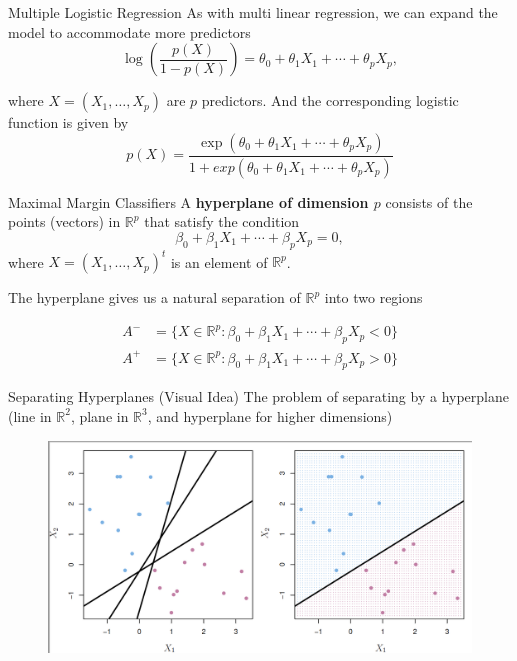 \documentclass{beamer}
\begin{document}
\begin{frame}{Multiple Logistic Regression}
	As with multi linear regression, we can expand the model to accommodate more predictors
	\begin{equation*}
		\log \left( \frac{p(X)}{1-p(X)} \right) = \theta_0 + \theta_1 X_1 + \cdots+ \theta_p X_p,
	\end{equation*} 
	
	where $X=(X_1,\ldots,X_p)$ are $p$ predictors. And the corresponding logistic function is given by
	\begin{equation*}
		p(X)= \frac{\exp(\theta_0 + \theta_1 X_1 + \cdots+ \theta_p X_p)}{1 +exp(\theta_0 + \theta_1 X_1 + \cdots+ \theta_p X_p) }
	\end{equation*}
\end{frame}

\begin{frame}{Maximal Margin Classifiers}
	A {\bf hyperplane of dimension $p$} consists of the points (vectors) in $
\mathbb{R}^p$ that satisfy the condition
\begin{equation}
	\beta_0 + \beta_1 X_1 + \cdots + \beta_p X_p=0,
	\label{eq:hyper}
\end{equation}
where $X= (X_1,\ldots, X_p)^t $ is an element of $\mathbb{R}^p$. 

The hyperplane gives us a natural separation of $\mathbb{R}^p$ into two regions

\begin{equation*}
	\begin{split}
		A^-&= \{X \in \mathbb{R}^p : \beta_0 + \beta_1 X_1 + \cdots + \beta_p X_p<0 \} \\
		A^+&= \{X \in \mathbb{R}^p : \beta_0 + \beta_1 X_1 + \cdots + \beta_p X_p >0 \}
	\end{split}		
\end{equation*}

\end{frame}

\begin{frame}{Separating Hyperplanes (Visual Idea)}
	The problem of separating by a hyperplane (line in $\mathbb{R}^2$, plane in $\mathbb{R}^3$, and hyperplane for higher dimensions)
	
		\begin{figure}[h]
		\centering
		\includegraphics[scale=0.4]{../../Figures/fig_separating_line.png}
	\end{figure}
	
\end{frame}
\end{document}
